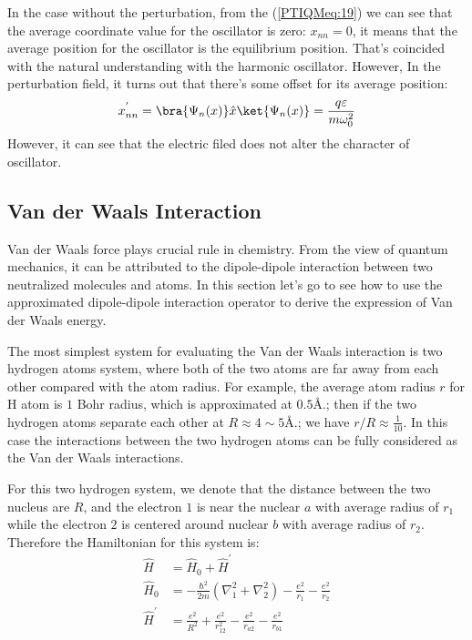 In the case without the perturbation, from the (\ref{PTIQMeq:19}) we
can see that the average coordinate value for the oscillator is
zero: $x_{nn} = 0$, it means that the average position for the
oscillator is the equilibrium position. That's coincided with the
natural understanding with the harmonic oscillator. However, In the
perturbation field, it turns out that there's some offset for its
average position:
\begin{equation}\label{}
x_{nn}^{'} = \bra{\Psi_{n}(x)}\hat{x}\ket{\Psi_{n}(x)} =
\frac{q\varepsilon}{m\omega_{0}^{2}}
\end{equation}
However, it can see that the electric filed does not alter the
character of oscillator.

\subsection{Van der Waals Interaction}
%
%
%
Van der Waals force plays crucial rule in chemistry. From the view
of quantum mechanics, it can be attributed to the dipole-dipole
interaction between two neutralized molecules and atoms. In this
section let's go to see how to use the approximated dipole-dipole
interaction operator to derive the expression of Van der Waals
energy.

The most simplest system for evaluating the Van der Waals
interaction is two hydrogen atoms system, where both of the two
atoms are far away from each other compared with the atom radius.
For example, the average atom radius $r$ for H atom is $1$ Bohr
radius, which is approximated at $0.5${\AA}.; then if the two
hydrogen atoms separate each other at $R \approx 4\sim 5${\AA}.; we
have $r/R \approx \frac{1}{10}$. In this case the interactions
between the two hydrogen atoms can be fully considered as the Van
der Waals interactions.

For this two hydrogen system, we denote that the distance between
the two nucleus are $R$, and the electron $1$ is near the nuclear
$a$ with average radius of $r_{1}$ while the electron $2$ is
centered around nuclear $b$ with average radius of $r_{2}$.
Therefore the Hamiltonian for this system is:
\begin{align}\label{}
\hat{H} &= \hat{H}_{0} + \hat{H}^{'} \nonumber \\
\hat{H}_{0} &= -\frac{\hbar^{2}}{2m}
(\nabla^{2}_{1} + \nabla^{2}_{2}) - \frac{e^{2}}{r_{1}}
- \frac{e^{2}}{r_{2}} \nonumber \\
\hat{H}^{'} &= \frac{e^{2}}{R^{2}} + \frac{e^{2}}{r_{12}^{2}} -
\frac{e^{2}}{r_{a2}} - \frac{e^{2}}{r_{b1}}
\end{align}


